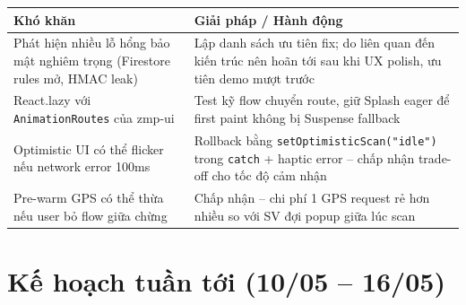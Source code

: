 \documentclass{article}
\begin{document}
\begin{tabularx}{\textwidth}{@{}X X@{}}
\toprule
\textbf{Khó khăn} & \textbf{Giải pháp / Hành động} \\
\midrule
Phát hiện nhiều lỗ hổng bảo mật nghiêm trọng (Firestore rules mở, HMAC leak) & Lập danh sách ưu tiên fix; do liên quan đến kiến trúc nên hoãn tới sau khi UX polish, ưu tiên demo mượt trước \\
\addlinespace
React.lazy với \texttt{AnimationRoutes} của zmp-ui & Test kỹ flow chuyển route, giữ Splash eager để first paint không bị Suspense fallback \\
\addlinespace
Optimistic UI có thể flicker nếu network error 100ms & Rollback bằng \texttt{setOptimisticScan("idle")} trong \texttt{catch} + haptic error -- chấp nhận trade-off cho tốc độ cảm nhận \\
\addlinespace
Pre-warm GPS có thể thừa nếu user bỏ flow giữa chừng & Chấp nhận -- chi phí 1 GPS request rẻ hơn nhiều so với SV đợi popup giữa lúc scan \\
\bottomrule
\end{tabularx}

\section{Kế hoạch tuần tới (10/05 -- 16/05)}
\end{document}
